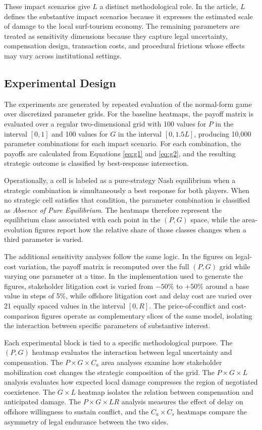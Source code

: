 \documentclass[final,times,authoryear]{elsarticle}
\newcommand{\verify}[1]{{\color{blue} {#1}}}
\begin{document}
These impact scenarios give $L$ a distinct methodological role. In the article, $L$ defines the substantive impact scenarios because it expresses the estimated scale of damage to the local surf-tourism economy. The remaining parameters are treated as sensitivity dimensions because they capture legal uncertainty, compensation design, transaction costs, and procedural frictions whose effects may vary across institutional settings.

\subsection{Experimental Design}

The experiments are generated by repeated evaluation of the normal-form game over discretized parameter grids. For the baseline heatmaps, the payoff matrix is evaluated over a regular two-dimensional grid with 100 values for $P$ in the interval $[0,1]$ and 100 values for $G$ in the interval $[0,1.5L]$, producing 10,000 parameter combinations for each impact scenario. For each combination, the payoffs are calculated from Equations \ref{eq:g1} and \ref{eq:g2}, and the resulting strategic outcome is classified by best-response intersection.

Operationally, a cell is labeled as a pure-strategy Nash equilibrium when a strategic combination is simultaneously a best response for both players. When no strategic cell satisfies that condition, the parameter combination is classified as \textit{Absence of Pure Equilibrium}. The heatmaps therefore represent the equilibrium class associated with each point in the $(P,G)$ space, while the area-evolution figures report how the relative share of those classes changes when a third parameter is varied.

The additional sensitivity analyses follow the same logic. In the figures on legal-cost variation, the payoff matrix is recomputed over the full $(P,G)$ grid while varying one parameter at a time. \verify{In the implementation used to generate the figures, stakeholder litigation cost is varied from $-50\%$ to $+50\%$ around a base value in steps of 5\%, while offshore litigation cost and delay cost are varied over 21 equally spaced values in the interval $[0,R]$.} The price-of-conflict and cost-comparison figures operate as complementary slices of the same model, isolating the interaction between specific parameters of substantive interest.

Each experimental block is tied to a specific methodological purpose. The $(P,G)$ heatmap evaluates the interaction between legal uncertainty and compensation. The $P \times G \times C_a$ area analyses examine how stakeholder mobilization cost changes the strategic composition of the grid. The $P \times G \times L$ analysis evaluates how expected local damage compresses the region of negotiated coexistence. The $G \times L$ heatmap isolates the relation between compensation and anticipated damage. The $P \times G \times LR$ analysis measures the effect of delay on offshore willingness to sustain conflict, and the $C_a \times C_s$ heatmaps compare the asymmetry of legal endurance between the two sides.
\end{document}
